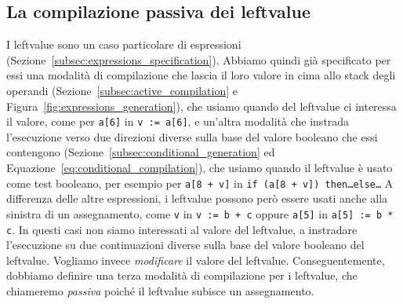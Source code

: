\subsection{La compilazione passiva dei leftvalue}
  \label{subsec:passive_generation}
%
I leftvalue sono un caso particolare di espressioni
(Sezione~\ref{subsec:expressions_specification}). Abbiamo quindi gi\`a
specificato per essi una modalit\`a di compilazione che lascia il loro
valore in cima allo stack degli operandi
(Sezione~\ref{subsec:active_compilation} e
Figura~\ref{fig:expressions_generation}), che usiamo quando
del leftvalue ci interessa il valore, come per \texttt{a[6]} in
\texttt{v := a[6]}, e un'altra modalit\`a che
instrada l'esecuzione verso due direzioni diverse sulla base del valore
booleano che essi contengono (Sezione~\ref{subsec:conditional_generation}
ed Equazione~\ref{eq:conditional_compilation}),
che usiamo quando il leftvalue \`e usato come test booleano, per esempio
per \texttt{a[8 + v]} in \texttt{if (a[8 + v]) then\ldots else\ldots}
A differenza delle altre espressioni, i leftvalue possono per\`o
essere usati anche
alla sinistra di un assegnamento, come \texttt{v} in \texttt{v := b + c}
oppure \texttt{a[5]} in \texttt{a[5] := b * c}. In questi casi non siamo
interessati al valore del leftvalue, \nec a instradare l'esecuzione
su due continuazioni diverse sulla base del valore booleano del leftvalue.
Vogliamo invece \emph{modificare} il valore del leftvalue. Conseguentemente,
dobbiamo definire una terza modalit\`a di compilazione per i leftvalue,
che chiameremo \emph{passiva} poich\'e il leftvalue subisce un assegnamento.

